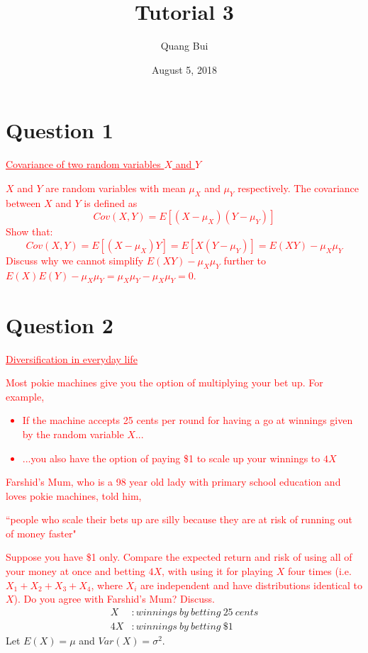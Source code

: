 \documentclass[12pt]{report}
\title{Tutorial 3}
\author{Quang Bui}
\subtitle
{
	\textbf{keywords}: covariance, expected value, diversification, variance, risk, vector, matrix
	
	\textbf{estimated reading time}: 30 minutes
}
\date{August 5, 2018}
\begin{document}
	
\maketitle

\section*{Question 1}
\textcolor{red}{\underline{Covariance of two random variables $X$ and $Y$}}

\noindent \textcolor{red}{$X$ and $Y$ are random variables with mean $\mu_X$ and $\mu_Y$ respectively. The covariance between $X$ and $Y$ is defined as $$Cov(X,Y) = E[(X-\mu_X)(Y-\mu_Y)]$$ Show that: $$Cov(X,Y) = E[(X-\mu_X)Y] = E[X(Y-\mu_Y)] = E(XY) - \mu_X \mu_Y$$ Discuss why we cannot simplify $E(XY) - \mu_X \mu_Y$ further to $E(X)E(Y) - \mu_X \mu_Y = \mu_X \mu_Y - \mu_X \mu_Y = 0$.}


\newpage
\section*{Question 2}
\textcolor{red}{\underline{Diversification in everyday life}}

\noindent \textcolor{red}{Most pokie machines give you the option of multiplying your bet up. For example,}
\noindent \textcolor{red}{
	\begin{itemize}
	\item If the machine accepts 25 cents per round for having a go at winnings given by the random variable $X$...
	\item ...you also have the option of paying \$1 to scale up your winnings to $4X$
\end{itemize}
}
\noindent \textcolor{red}{Farshid's Mum, who is a 98 year old lady with primary school education and loves pokie machines, told him,}
\noindent \textcolor{red}{\begin{center}
		``people who scale their bets up are silly because they are at risk of running out of money faster"
	\end{center}
}
\noindent \textcolor{red}{Suppose you have \$1 only. Compare the expected return and risk of using all of your money at once and betting $4X$, with using it for playing $X$ four times (i.e. $X_1+X_2+X_3+X_4$, where $X_i$ are independent and have distributions identical to $X$). Do you agree with Farshid's Mum? Discuss.}
\begin{align*}
	X&: winnings\ by\ betting\ 25\ cents \\
	4X&: winnings\ by\ betting\ \$1 
\end{align*}
\noindent Let $E(X) = \mu$ and $Var(X) = \sigma^2$.
\end{document}

